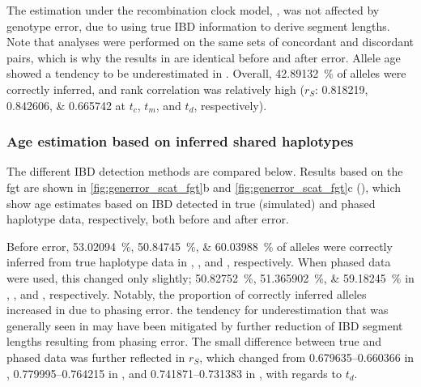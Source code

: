 The estimation under the recombination clock model, \ClockR, was not affected by genotype error, due to using true IBD information to derive segment lengths.
Note that analyses were performed on the same sets of concordant and discordant pairs, which is why the results in \ClockR are identical before and after error.
Allele age showed a tendency to be underestimated in \ClockR.
Overall, \SI{42.89132}{\percent} of alleles were correctly inferred,
and rank correlation was relatively high
($r_S$: \numlist{0.818219;0.842606;0.665742} at $t_c$, $t_m$, and $t_d$, respectively).


%
\subsubsection{Age estimation based on inferred shared haplotypes}
%

The different IBD detection methods are compared below.
Results based on the \gls{fgt} are shown in
\cref{fig:generror_scat_fgt}{b} and \ref{fig:generror_scat_fgt}{c} (), which show age estimates based on IBD detected in true (simulated) and phased haplotype data, respectively, both before and after error.

%

%

Before error, \SIlist{53.02094;50.84745;60.03988}{\percent} of alleles were correctly inferred from true haplotype data in \ClockM, \ClockR, and \ClockC, respectively.
When phased data were used, this changed only slightly; \SIlist{50.82752;51.365902;59.18245}{\percent} in \ClockM, \ClockR, and \ClockC, respectively.
Notably, the proportion of correctly inferred alleles increased in \ClockR due to phasing error.
 the tendency for underestimation that was generally seen in \ClockR may have been mitigated by further reduction of IBD segment lengths resulting from phasing error.
The small difference between true and phased data was further reflected in $r_S$, which changed from \numrange{0.679635}{0.660366} in \ClockM, \numrange{0.779995}{0.764215} in \ClockR, and \numrange{0.741871}{0.731383} in \ClockC, with regards to $t_d$.

